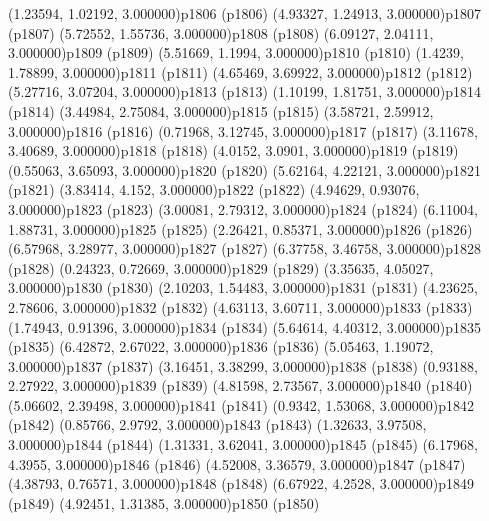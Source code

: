 \psPoint(1.23594, 1.02192, 3.000000){p1806}
\psdot(p1806)
\psPoint(4.93327, 1.24913, 3.000000){p1807}
\psdot(p1807)
\psPoint(5.72552, 1.55736, 3.000000){p1808}
\psdot(p1808)
\psPoint(6.09127, 2.04111, 3.000000){p1809}
\psdot(p1809)
\psPoint(5.51669, 1.1994, 3.000000){p1810}
\psdot(p1810)
\psPoint(1.4239, 1.78899, 3.000000){p1811}
\psdot(p1811)
\psPoint(4.65469, 3.69922, 3.000000){p1812}
\psdot(p1812)
\psPoint(5.27716, 3.07204, 3.000000){p1813}
\psdot(p1813)
\psPoint(1.10199, 1.81751, 3.000000){p1814}
\psdot(p1814)
\psPoint(3.44984, 2.75084, 3.000000){p1815}
\psdot(p1815)
\psPoint(3.58721, 2.59912, 3.000000){p1816}
\psdot(p1816)
\psPoint(0.71968, 3.12745, 3.000000){p1817}
\psdot(p1817)
\psPoint(3.11678, 3.40689, 3.000000){p1818}
\psdot(p1818)
\psPoint(4.0152, 3.0901, 3.000000){p1819}
\psdot(p1819)
\psPoint(0.55063, 3.65093, 3.000000){p1820}
\psdot(p1820)
\psPoint(5.62164, 4.22121, 3.000000){p1821}
\psdot(p1821)
\psPoint(3.83414, 4.152, 3.000000){p1822}
\psdot(p1822)
\psPoint(4.94629, 0.93076, 3.000000){p1823}
\psdot(p1823)
\psPoint(3.00081, 2.79312, 3.000000){p1824}
\psdot(p1824)
\psPoint(6.11004, 1.88731, 3.000000){p1825}
\psdot(p1825)
\psPoint(2.26421, 0.85371, 3.000000){p1826}
\psdot(p1826)
\psPoint(6.57968, 3.28977, 3.000000){p1827}
\psdot(p1827)
\psPoint(6.37758, 3.46758, 3.000000){p1828}
\psdot(p1828)
\psPoint(0.24323, 0.72669, 3.000000){p1829}
\psdot(p1829)
\psPoint(3.35635, 4.05027, 3.000000){p1830}
\psdot(p1830)
\psPoint(2.10203, 1.54483, 3.000000){p1831}
\psdot(p1831)
\psPoint(4.23625, 2.78606, 3.000000){p1832}
\psdot(p1832)
\psPoint(4.63113, 3.60711, 3.000000){p1833}
\psdot(p1833)
\psPoint(1.74943, 0.91396, 3.000000){p1834}
\psdot(p1834)
\psPoint(5.64614, 4.40312, 3.000000){p1835}
\psdot(p1835)
\psPoint(6.42872, 2.67022, 3.000000){p1836}
\psdot(p1836)
\psPoint(5.05463, 1.19072, 3.000000){p1837}
\psdot(p1837)
\psPoint(3.16451, 3.38299, 3.000000){p1838}
\psdot(p1838)
\psPoint(0.93188, 2.27922, 3.000000){p1839}
\psdot(p1839)
\psPoint(4.81598, 2.73567, 3.000000){p1840}
\psdot(p1840)
\psPoint(5.06602, 2.39498, 3.000000){p1841}
\psdot(p1841)
\psPoint(0.9342, 1.53068, 3.000000){p1842}
\psdot(p1842)
\psPoint(0.85766, 2.9792, 3.000000){p1843}
\psdot(p1843)
\psPoint(1.32633, 3.97508, 3.000000){p1844}
\psdot(p1844)
\psPoint(1.31331, 3.62041, 3.000000){p1845}
\psdot(p1845)
\psPoint(6.17968, 4.3955, 3.000000){p1846}
\psdot(p1846)
\psPoint(4.52008, 3.36579, 3.000000){p1847}
\psdot(p1847)
\psPoint(4.38793, 0.76571, 3.000000){p1848}
\psdot(p1848)
\psPoint(6.67922, 4.2528, 3.000000){p1849}
\psdot(p1849)
\psPoint(4.92451, 1.31385, 3.000000){p1850}
\psdot(p1850)
